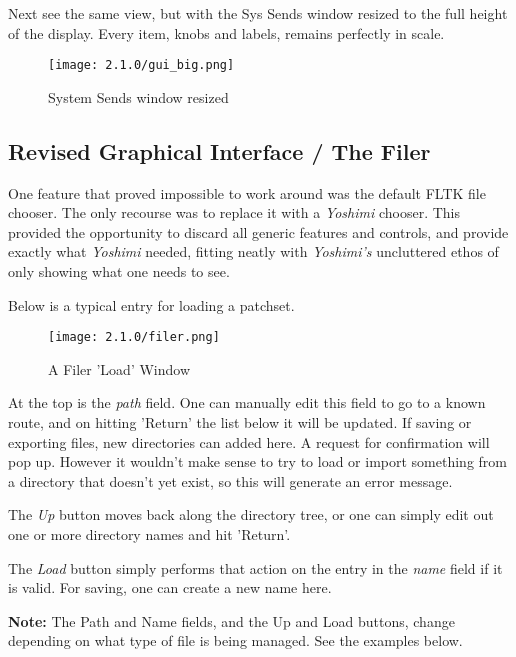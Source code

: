    Next see the same view, but with the Sys Sends window resized to the
   full height of the display. Every item, knobs and labels,
   remains perfectly in scale.

   \begin{figure}[H]
      \centering
      \texttt{[image: 2.1.0/gui\_big.png]}
      \caption{System Sends window resized}
      \label{fig:resized_sends_window}
   \end{figure}

\subsection{Revised Graphical Interface / The Filer}
\label{subsec:interface_filer}

   One feature that proved impossible to work around was the default FLTK file
   chooser. The only recourse was to replace it with a \textsl{Yoshimi}
   chooser.
   This provided the opportunity to discard all generic features and controls,
   and provide exactly what \textsl{Yoshimi} needed, fitting neatly with
   \textsl{Yoshimi's} uncluttered ethos of only showing what one needs to see.

   Below is a typical entry for loading a patchset.

   \begin{figure}[H]
      \centering
      \texttt{[image: 2.1.0/filer.png]}
      \caption{A Filer 'Load' Window}
      \label{fig:filer_load_window}
   \end{figure}

   At the top is the \textsl{path} field. One can manually edit this field to go
   to a known route, and on hitting 'Return' the list below it will be updated.
   If saving or exporting files, new directories can added here. A request for
   confirmation will pop up. However it wouldn't make sense to try to load or
   import something from a directory that doesn't yet exist, so this will
   generate an error message.

   The \textsl{Up} button moves back along the directory tree, or one can simply
   edit out one or more directory names and hit 'Return'.

   The \textsl{Load} button simply performs that action on the entry in the
   \textsl{name} field if it is valid. For saving, one can create a
   new name here.

    \textbf{Note:} The Path and Name fields, and the Up and Load buttons,
    change depending on what type of file is being managed. See the examples
    below.

